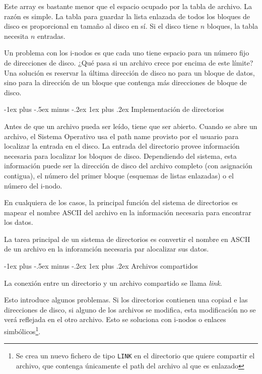 \documentclass[10pt,portrait, twocolumn]{article}
\makeatletter
\renewcommand{\subsubsection}{\@startsection{subsubsection}{3}{0mm}%
                                {-1ex plus -.5ex minus -.2ex}%
                                {1ex plus .2ex}%
                                {\normalfont\small\bfseries}}
\makeatother
\begin{document}
	
Este array es bastante menor que el espacio ocupado por la tabla de archivo. La razón es simple. La tabla para guardar la lista enlazada de todos los bloques de disco es proporcional en tamaño al disco en sí. Si el disco tiene $n$ bloques, la tabla necesita $n$ entradas. 

	\quad Un problema con los i-nodos es que cada uno tiene espacio para un número fijo de direcciones de disco. ¿Qué pasa si un archivo crece por encima de este límite? Una solución es reservar la última dirección de disco no para un bloque de datos, sino para la dirección de un bloque que contenga más direcciones de bloque de disco. 
	
\subsubsection{Implementación de directorios}

Antes de que un archivo pueda ser leído, tiene que ser abierto. Cuando se abre un archivo, el Sistema Operativo usa el path name provisto por el usuario  para localizar la entrada en el disco. La entrada del directorio provee información necesaria para localizar los bloques de disco. Dependiendo del sistema, esta información puede ser la dirección de disco del archivo completo (con asignación contigua), el número del primer bloque (esquemas de listas enlazadas) o el número del i-nodo.

	\quad En cualquiera de los casos, la principal función del sistema de directorios es mapear el nombre ASCII del archivo en la información necesaria para encontrar los datos.

La tarea principal de un sistema de directorios es convertir el nombre en ASCII de un archivo en la inforamción necesaria par alocalizar sus datos.

\subsubsection{Archivos compartidos}

La conexión entre un directorio y un archivo compartido se llama \textit{link}. 

	\quad Esto introduce algunos problemas. Si los directorios contienen una copiad e las direcciones de disco, si alguno de los archivos se modifica, esta modificación no se verá reflejada en el otro archivo. Esto se soluciona con i-nodos o enlaces simbólicos\footnote{Se crea un nuevo fichero de tipo \texttt{LINK} en el directorio que quiere compartir el archivo, que contenga únicamente el path del archivo al que es enlazado}.
	
\end{document}
